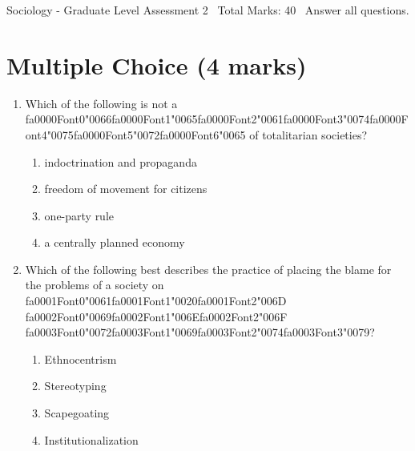 \documentclass[12pt]{article}
\begin{document}
\begin{center}
Sociology - Graduate Level Assessment 2 \
Total Marks: 40 \
Answer all questions.
\end{center}

\section*{Multiple Choice (4 marks)}
\begin{enumerate}[label=\arabic*.]
\item Which of the following is not a {\csname fa0000Font0\endcsname\char"0066}{\csname fa0000Font1\endcsname\char"0065}{\csname fa0000Font2\endcsname\char"0061}{\csname fa0000Font3\endcsname\char"0074}{\csname fa0000Font4\endcsname\char"0075}{\csname fa0000Font5\endcsname\char"0072}{\csname fa0000Font6\endcsname\char"0065} of totalitarian societies?
\begin{enumerate}[label=(\alph*)]
    \item indoctrination and propaganda
    \item freedom of movement for citizens
    \item one-party rule
    \item a centrally planned economy
\end{enumerate}
\item Which of the following best describes the practice of placing the blame for the problems of a society on {\csname fa0001Font0\endcsname\char"0061}{\csname fa0001Font1\endcsname\char"0020}{\csname fa0001Font2\endcsname\char"006D} {\csname fa0002Font0\endcsname\char"0069}{\csname fa0002Font1\endcsname\char"006E}{\csname fa0002Font2\endcsname\char"006F} {\csname fa0003Font0\endcsname\char"0072}{\csname fa0003Font1\endcsname\char"0069}{\csname fa0003Font2\endcsname\char"0074}{\csname fa0003Font3\endcsname\char"0079}?
\begin{enumerate}[label=(\alph*)]
    \item Ethnocentrism
    \item Stereotyping
    \item Scapegoating
    \item Institutionalization
\end{enumerate}
\end{enumerate}
\end{document}
